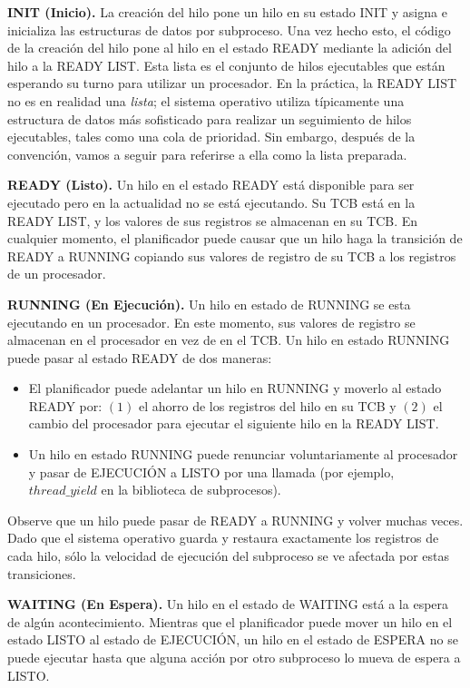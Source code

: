 \documentclass[10pt]{book}
\begin{document}
\textbf{INIT (Inicio).} La creación del hilo pone un hilo en su estado INIT y asigna e inicializa las estructuras de datos por subproceso. Una vez hecho esto, el código de la creación del hilo pone al hilo en el estado READY mediante la adición del hilo a la READY LIST. Esta lista es el conjunto de hilos ejecutables que están esperando su turno para utilizar un procesador. En la práctica, la READY LIST no es en realidad una \textit{lista}; el sistema operativo utiliza típicamente una estructura de datos más sofisticado para realizar un seguimiento de hilos ejecutables, tales como una cola de prioridad. Sin embargo, después de la convención, vamos a seguir para referirse a ella como la lista preparada.

\textbf{READY (Listo).} Un hilo en el estado READY está disponible para ser ejecutado pero en la actualidad no se está ejecutando. Su TCB está en la READY LIST, y los valores de sus registros se almacenan en su TCB. En cualquier momento, el planificador puede causar que un hilo haga la transición de READY a RUNNING copiando sus valores de registro de su TCB a los registros de un procesador.

\textbf{RUNNING (En Ejecución).} Un hilo en estado de RUNNING se esta ejecutando en un procesador. En este momento, sus valores de registro se almacenan en el procesador en vez de en el TCB. Un hilo en estado RUNNING puede pasar al estado READY de dos maneras:
\begin{itemize}
\item El planificador puede adelantar un hilo en RUNNING y moverlo al estado READY por: $(1)$ el ahorro de los registros del hilo en su TCB y $(2)$ el cambio del procesador para ejecutar el siguiente hilo en la READY LIST.
\item Un hilo en estado RUNNING puede renunciar voluntariamente al procesador y pasar de EJECUCIÓN a LISTO por una llamada (por ejemplo, $thread\_ yield$ en la biblioteca de subprocesos).
\end{itemize}

Observe que un hilo puede pasar de READY a RUNNING y volver muchas veces. Dado que el sistema operativo guarda y restaura exactamente los registros de cada hilo, sólo la velocidad de ejecución del subproceso se ve afectada por estas transiciones.

\textbf{WAITING (En Espera).} Un hilo en el estado de WAITING está a la espera de algún acontecimiento. Mientras que el planificador puede mover un hilo en el estado LISTO al estado de EJECUCIÓN, un hilo en el estado de ESPERA no se puede ejecutar hasta que alguna acción por otro subproceso lo mueva de espera a LISTO.
\end{document}
